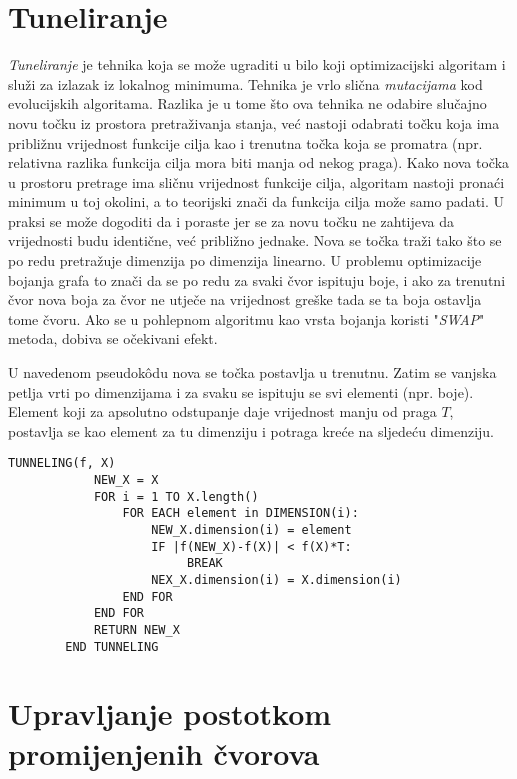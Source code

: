 \documentclass[times, utf8, diplomski, numeric]{fer}
\begin{document}
\section{Tuneliranje}

\emph{Tuneliranje} je tehnika koja se može ugraditi u bilo koji optimizacijski algoritam i služi za izlazak iz lokalnog minimuma. Tehnika je vrlo slična \emph{mutacijama} kod evolucijskih algoritama. Razlika je u tome što ova tehnika ne odabire slučajno novu točku iz prostora pretraživanja stanja, već nastoji odabrati točku koja ima približnu vrijednost funkcije cilja kao i trenutna točka koja se promatra (npr. relativna razlika funkcija cilja mora biti manja od nekog praga). Kako nova točka u prostoru pretrage ima sličnu vrijednost funkcije cilja, algoritam nastoji pronaći minimum u toj okolini, a to teorijski znači da funkcija cilja može samo padati. U praksi se može dogoditi da i poraste jer se za novu točku ne zahtijeva da vrijednosti budu identične, već približno jednake. Nova se točka traži tako što se po redu pretražuje dimenzija po dimenzija linearno. U problemu optimizacije bojanja grafa to znači da se po redu za svaki čvor ispituju boje, i ako za trenutni čvor nova boja za čvor ne utječe na vrijednost greške tada se ta boja ostavlja tome čvoru. Ako se u pohlepnom algoritmu kao vrsta bojanja koristi "\emph{SWAP}" metoda, dobiva se očekivani efekt. 

U navedenom pseudok\^{o}du nova se točka postavlja u trenutnu. Zatim se vanjska petlja vrti po dimenzijama i za svaku se ispituju se svi elementi (npr. boje). Element koji za apsolutno odstupanje daje vrijednost manju od praga $T$, postavlja se kao element za tu dimenziju i potraga kreće na sljedeću dimenziju.

\begin{singlespace}
	\begin{lstlisting}[caption=Metoda tuneliranja - implementacija]
		TUNNELING(f, X)
			NEW_X = X
			FOR i = 1 TO X.length()
				FOR EACH element in DIMENSION(i):
					NEW_X.dimension(i) = element
					IF |f(NEW_X)-f(X)| < f(X)*T:
						 BREAK
					NEX_X.dimension(i) = X.dimension(i)
				END FOR
			END FOR
			RETURN NEW_X
		END TUNNELING
	\end{lstlisting}
\end{singlespace}

\section{Upravljanje postotkom promijenjenih čvorova}
\end{document}
